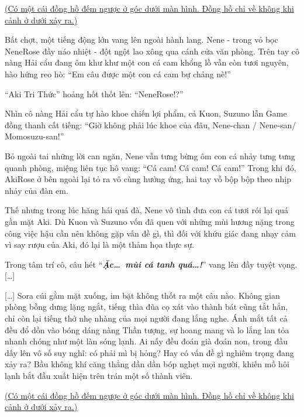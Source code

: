\documentclass[../main.tex]{subfiles}
\begin{document}
\begin{center}
  \uline{(Có một cái đồng hồ đếm ngược ở góc dưới màn hình. Đồng hồ chỉ về không khi cảnh ở dưới xảy ra.)}
\end{center}

Bất chợt, một tiếng động lớn vang lên ngoài hành lang. Nene - trong vỏ bọc NeneRose đầy náo nhiệt - đột ngột lao xông qua cánh cửa văn phòng. Trên tay cô nàng Hải cẩu đang ôm khư khư một con cá cam khổng lồ vẫn còn tươi nguyên, hào hứng reo hò: ``Em câu được một con cá cam bự chảng nè!''


``Aki Tri Thức'' hoảng hốt thốt lên: ``NeneRose!?''

Nhìn cô nàng Hải cẩu tự hào khoe chiến lợi phẩm, cả Kuon, Suzuno lẫn Game đồng thanh cất tiếng: ``Giờ không phải lúc khoe của đâu, Nene-chan / Nene-san/ Momosuzu-san!''

Bỏ ngoài tai những lời can ngăn, Nene vẫn tưng bừng ôm con cá nhảy tưng tưng quanh phòng, miệng liên tục hô vang: ``Cá cam! Cá cam! Cá cam!'' Trong khi đó, AkiRose ở bên ngoài lại tỏ ra vô cùng hưởng ứng, hai tay vỗ bộp bộp theo nhịp nhảy của đàn em.

Thế nhưng trong lúc hăng hái quá đà, Nene vô tình đưa con cá tươi rói lại quá gần mặt Aki. Dù Kuon và Suzuno vốn đã quen với những mùi hương nặng trong công việc hậu cần nên không gặp vấn đề gì, thì đối với khứu giác đang nhạy cảm vì say rượu của Aki, đó lại là một thảm họa thực sự.


Trong tâm trí cô, câu hét ``\textbf{\textit{Ặc\dots\ mùi cá tanh quá\dots!}}'' vang lên đầy tuyệt vọng. [\dots]


[\dots] Sora cúi gằm mặt xuống, im bặt không thốt ra một câu nào. Không gian phòng bỗng dưng lặng ngắt, tiếng thìa đũa cọ xát vào thành bát cũng tắt hẳn, chỉ còn lại tiếng thở nhẹ nhàng của mọi người đang lắng nghe. Ánh mắt tất cả đều đổ dồn vào bóng dáng nàng Thần tượng, sự hoang mang và lo lắng lan tỏa nhanh chóng như một làn sóng lạnh. Ai nấy đều đoán già đoán non, trong đầu dấy lên vô số suy nghĩ: có phải mì bị hỏng? Hay có vấn đề gì nghiêm trọng đang xảy ra? Bầu không khí căng thẳng dần dần bóp nghẹt mọi người, khiến mồ hôi lạnh bắt đầu xuất hiện trên trán một số thành viên.

\begin{center}
  \uline{(Có một cái đồng hồ đếm ngược ở góc dưới màn hình. Đồng hồ chỉ về không khi cảnh ở dưới xảy ra.)}
\end{center}
\end{document}
